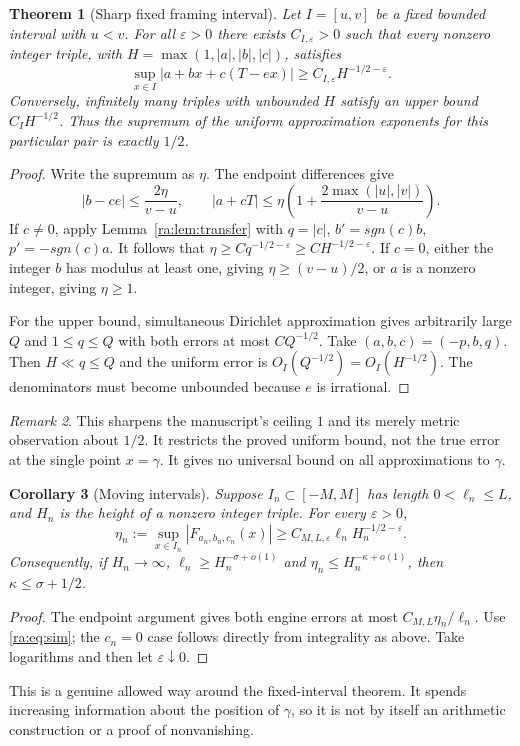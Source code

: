\documentclass[11pt,a4paper]{article}
\newtheorem{theorem}{Theorem}[section]
\newtheorem{corollary}[theorem]{Corollary}
\theoremstyle{definition}
\theoremstyle{remark}
\newtheorem{remark}[theorem]{Remark}
\theoremstyle{plain}
\numberwithin{equation}{section}
\def\operatorname#1{#1}\def\mathrm#1{#1}}
\begin{document}
\begin{theorem}[Sharp fixed framing interval]\label{ra:thm:half}
Let $I=[u,v]$ be a fixed bounded interval with $u<v$. For all $\varepsilon>0$ there exists $C_{I,\varepsilon}>0$ such that every nonzero integer triple, with $H=\max(1,|a|,|b|,|c|)$, satisfies
\begin{equation}\label{ra:eq:uniform}
 \sup_{x\in I}|a+bx+c(T-ex)|\ge C_{I,\varepsilon}H^{-1/2-\varepsilon}.
\end{equation}
Conversely, infinitely many triples with unbounded $H$ satisfy an upper bound $C_IH^{-1/2}$. Thus the supremum of the uniform approximation exponents for this particular pair is exactly $1/2$.
\end{theorem}
\begin{proof}
Write the supremum as $\eta$. The endpoint differences give
\[
 |b-ce|\le\frac{2\eta}{v-u},\qquad
 |a+cT|\le\eta\left(1+\frac{2\max(|u|,|v|)}{v-u}\right).
\]
If $c\ne0$, apply Lemma~\ref{ra:lem:transfer} with $q=|c|$, $b'=\operatorname{sgn}(c)b$, $p'=-\operatorname{sgn}(c)a$. It follows that $\eta\ge Cq^{-1/2-\varepsilon}\ge CH^{-1/2-\varepsilon}$. If $c=0$, either the integer $b$ has modulus at least one, giving $\eta\ge(v-u)/2$, or $a$ is a nonzero integer, giving $\eta\ge1$.

For the upper bound, simultaneous Dirichlet approximation gives arbitrarily large $Q$ and $1\le q\le Q$ with both errors at most $C Q^{-1/2}$. Take $(a,b,c)=(-p,b,q)$. Then $H\ll q\le Q$ and the uniform error is $O_I(Q^{-1/2})=O_I(H^{-1/2})$. The denominators must become unbounded because $e$ is irrational.
\end{proof}

\begin{remark}
This sharpens the manuscript's ceiling $1$ and its merely metric observation about $1/2$. It restricts the proved uniform bound, not the true error at the single point $x=\gamma$. It gives no universal bound on all approximations to $\gamma$.
\end{remark}

\begin{corollary}[Moving intervals]\label{ra:cor:moving}
Suppose $I_n\subset[-M,M]$ has length $0<\ell_n\le L$, and $H_n$ is the height of a nonzero integer triple. For every $\varepsilon>0$,
\[
 \eta_n:=\sup_{x\in I_n}|F_{a_n,b_n,c_n}(x)|
 \ge C_{M,L,\varepsilon}\ell_n H_n^{-1/2-\varepsilon}.
\]
Consequently, if $H_n\to\infty$, $\ell_n\ge H_n^{-\sigma+o(1)}$ and $\eta_n\le H_n^{-\kappa+o(1)}$, then $\kappa\le\sigma+1/2$.
\end{corollary}
\begin{proof}
The endpoint argument gives both engine errors at most $C_{M,L}\eta_n/\ell_n$. Use \eqref{ra:eq:sim}; the $c_n=0$ case follows directly from integrality as above. Take logarithms and then let $\varepsilon\downarrow0$.
\end{proof}
This is a genuine allowed way around the fixed-interval theorem. It spends increasing information about the position of $\gamma$, so it is not by itself an arithmetic construction or a proof of nonvanishing.
\end{document}
